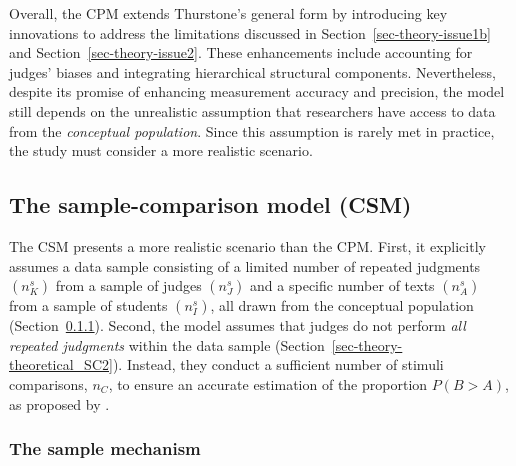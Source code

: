 \documentclass[
  authoryear,
  review,
  1p]{elsarticle}
\begin{document}
Overall, the CPM extends Thurstone's general form by introducing key
innovations to address the limitations discussed in
Section~\ref{sec-theory-issue1b} and Section~\ref{sec-theory-issue2}.
These enhancements include accounting for judges' biases and integrating
hierarchical structural components. Nevertheless, despite its promise of
enhancing measurement accuracy and precision, the model still depends on
the unrealistic assumption that researchers have access to data from the
\emph{conceptual population}. Since this assumption is rarely met in
practice, the study must consider a more realistic scenario.

\subsection{The sample-comparison model
(CSM)}\label{sec-theory-theoretical_SC}

The CSM presents a more realistic scenario than the CPM. First, it
explicitly assumes a data sample consisting of a limited number of
repeated judgments \((n^{s}_{K})\) from a sample of judges
\((n^{s}_{J})\) and a specific number of texts \((n^{s}_{A})\) from a
sample of students \((n^{s}_{I})\), all drawn from the conceptual
population (Section~\ref{sec-theory-theoretical_SC1}). Second, the model
assumes that judges do not perform \emph{all repeated judgments} within
the data sample (Section~\ref{sec-theory-theoretical_SC2}). Instead,
they conduct a sufficient number of stimuli comparisons, \(n_{C}\), to
ensure an accurate estimation of the proportion \(P(B>A)\), as proposed
by \citet{Thurstone_1927b}.

\subsubsection{The sample mechanism}\label{sec-theory-theoretical_SC1}
\end{document}
